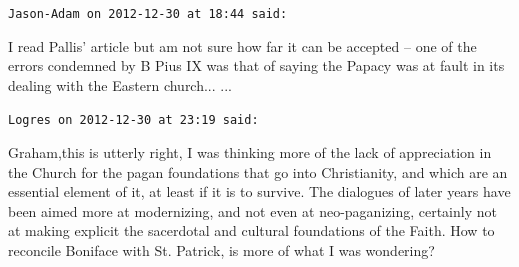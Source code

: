 \begin{footnotesize}
\begin{sffamily}
\hfill

\texttt{Jason-Adam on 2012-12-30 at 18:44 said:}

I read Pallis' article but am not sure how far it can be accepted -- one of the errors condemned by B Pius IX was that of saying the Papacy was at fault in its dealing with the Eastern church... ... 

\hfill

\texttt{Logres on 2012-12-30 at 23:19 said:}

Graham,this is utterly right, I was thinking more of the lack of appreciation in the Church for the pagan foundations that go into Christianity, and which are an essential element of it, at least if it is to survive. The dialogues of later years have been aimed more at modernizing, and not even at neo-paganizing, certainly not at making explicit the sacerdotal and cultural foundations of the Faith. How to reconcile Boniface with St. Patrick, is more of what I was wondering?


\hfill

\end{sffamily}
\end{footnotesize}


